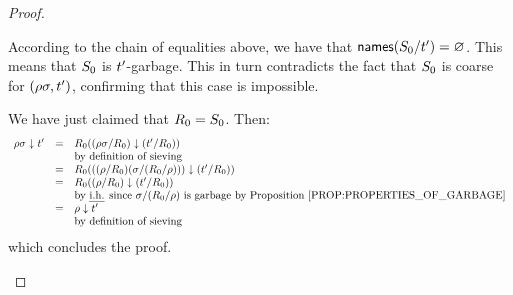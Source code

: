 \begin{proof}
\begin{enumerate}
\begin{enumerate}
    According to the chain of equalities above, we have that $\mathsf{names}(S_0/t') = \varnothing$.
    This means that $S_0$ is $t'$-garbage.
    This in turn contradicts the fact that $S_0$ is coarse for $(\rho\sigma,t')$,
    confirming that this case is impossible.
  \end{enumerate}
  We have just claimed that $R_0 = S_0$.
  Then:
  \[
    \begin{array}{rcl}
    \redseq\redseqtwo \sieve \tm'
    & = & \redex_0((\redseq\redseqtwo/\redex_0) \sieve (\tm'/\redex_0)) \\
    &   & \text{by definition of sieving} \\
    & = & \redex_0(((\redseq/\redex_0)(\redseqtwo/(\redex_0/\redseq))) \sieve (\tm'/\redex_0)) \\
    & = & \redex_0((\redseq/\redex_0) \sieve (\tm'/\redex_0)) \\
    &   & \text{by \ih since $\redseqtwo/(\redex_0/\redseq)$ is garbage by \rprop{properties_of_garbage}} \\
    & = & \redseq \sieve \tm' \\
    &   & \text{by definition of sieving}
    \end{array}
  \]
  which concludes the proof.
\end{enumerate}
\end{proof}


